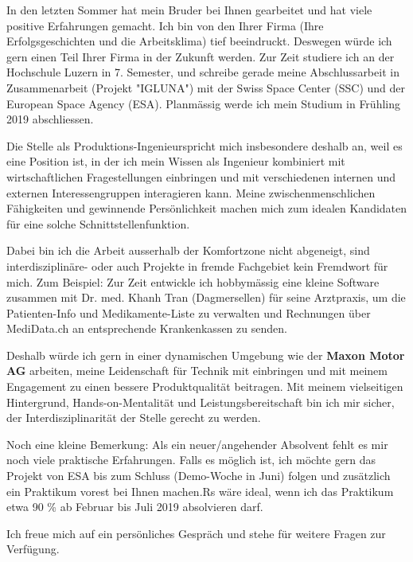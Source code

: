\documentclass[11pt, a4paper]{awesome-cv}
\newcommand{\companyName}{Maxon Motor AG}
\newcommand{\jobPosition}{Produktions-Ingenieur}
\begin{document}
\makecvheader

\makelettertitle

\begin{cvletter}

In den letzten Sommer hat mein Bruder bei Ihnen gearbeitet und hat viele positive Erfahrungen gemacht. Ich bin von den Ihrer Firma (Ihre Erfolgsgeschichten und die Arbeitsklima) tief beeindruckt. Deswegen würde ich gern einen Teil Ihrer Firma in der Zukunft werden. Zur Zeit studiere ich an der Hochschule Luzern in 7. Semester, und schreibe gerade meine Abschlussarbeit in Zusammenarbeit (Projekt "IGLUNA") mit der Swiss Space Center (SSC) und der European Space Agency (ESA). Planmässig werde ich mein Studium in Frühling 2019 abschliessen.	

Die Stelle als \jobPosition spricht mich insbesondere deshalb an, weil es eine Position ist, in der ich mein Wissen als Ingenieur kombiniert mit wirtschaftlichen Fragestellungen einbringen und mit verschiedenen internen und externen Interessengruppen interagieren kann. Meine zwischenmenschlichen Fähigkeiten und gewinnende Persönlichkeit machen mich zum idealen Kandidaten für eine solche Schnittstellenfunktion.
 
Dabei bin ich die Arbeit ausserhalb der Komfortzone nicht abgeneigt, sind interdisziplinäre- oder auch Projekte in fremde Fachgebiet kein Fremdwort für mich. Zum Beispiel: Zur Zeit entwickle ich hobbymässig eine kleine Software zusammen mit Dr. med. Khanh Tran (Dagmersellen) für seine Arztpraxis, um die Patienten-Info und Medikamente-Liste zu verwalten und Rechnungen über MediData.ch an entsprechende Krankenkassen zu senden. 

Deshalb würde ich gern in einer dynamischen Umgebung wie der \textbf{\companyName} arbeiten, meine Leidenschaft für Technik mit einbringen und mit meinem Engagement zu einen bessere Produktqualität beitragen. Mit meinem vielseitigen Hintergrund, Hands-on-Mentalität und Leistungsbereitschaft bin ich mir sicher, der Interdisziplinarität der Stelle gerecht zu werden. 

Noch eine kleine Bemerkung: Als ein neuer/angehender Absolvent fehlt es mir noch viele praktische Erfahrungen. Falls es möglich ist, ich möchte gern das Projekt von ESA bis zum Schluss (Demo-Woche in Juni) folgen und zusätzlich ein Praktikum vorest bei Ihnen machen.Rs wäre ideal, wenn ich das Praktikum etwa 90 \% ab Februar bis Juli 2019 absolvieren darf. 

Ich freue mich auf ein persönliches Gespräch und stehe für weitere Fragen zur Verfügung.

\end{cvletter}

\makeletterclosing
\end{document}
